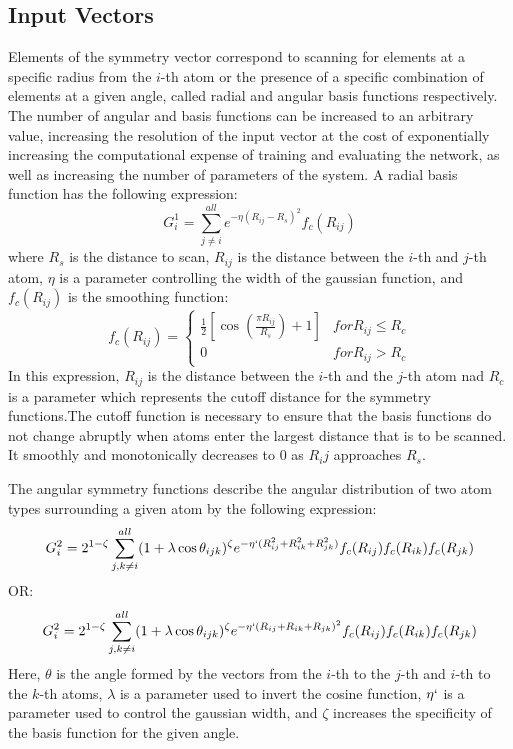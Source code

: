 \documentclass{article}
\begin{document}
\subsection{Input Vectors}
Elements of the symmetry vector correspond to scanning for elements at a specific radius from the $i$-th atom or the presence of a specific combination of elements at a given angle, called radial and angular basis functions respectively.
 The number of angular and basis functions can be increased to an arbitrary value, increasing the resolution of the input vector at the cost of exponentially increasing the computational expense of training and evaluating the network, as well as increasing the number of parameters of the system. 
 A radial basis function has the following expression:
\begin{equation}\label{eq:rad}
	G^{1}_{i} = \sum_{j \neq i}^{all} e^{-\eta ( R_{ij} - R_{s})^2} f_{c}(R_{ij})
\end{equation}
where $R_s$ is the distance to scan, $R_{ij}$ is the distance between the $i$-th and $j$-th atom, $\eta$ is a parameter controlling the width of the gaussian function, and $f_c(R_{ij})$ is the smoothing function:
\begin{equation}
 	f_c(R_{ij}) = 
	\begin{cases}
		\frac{1}{2}\left[\cos{(\frac{\pi R_{ij}} {R_s})} + 1 \right] & for R_{ij} \leq R_{c} \\
		0 & for R_{ij} > R_c

	\end{cases}
\end{equation}
In this expression, $R_{ij}$ is the distance between the $i$-th and the $j$-th atom nad $R_c$ is a parameter which represents the cutoff distance for the symmetry functions.The cutoff function is necessary to ensure that the basis functions do not change abruptly when atoms enter the largest distance that is to be scanned. It smoothly and monotonically decreases to 0 as $R_ij$ approaches $R_s$.

The angular symmetry functions describe the angular distribution of two atom types surrounding a given atom by the following expression:
\begin{equation}\label{eq:ang}
	G_i^2 = 2^{1 - \zeta} \sum_{j,k \neq i}^{all} ( 1 + \lambda \cos{\theta_{ijk}}) ^\zeta e^{-\eta` ( R_{ij}^2 + R_{ik}^2 + R_{jk}^2)} f_c (R_{ij}) f_c(R_{ik}) f_c(R_{jk})
\end{equation}
OR:
\begin{equation}\label{eq:ang}
	G_i^2 = 2^{1 - \zeta} \sum_{j,k \neq i}^{all} ( 1 + \lambda \cos{\theta_{ijk}}) ^\zeta e^{-\eta` ( R_{ij} + R_{ik} + R_{jk})^2} f_c (R_{ij}) f_c(R_{ik}) f_c(R_{jk})
\end{equation}
Here, $\theta$ is the angle formed by the vectors from the $i$-th to the $j$-th and $i$-th to the $k$-th atoms, $\lambda$ is a parameter used to invert the  cosine function, $\eta `$ is a parameter used to control the gaussian width, and $\zeta$ increases the specificity of the basis function for the given angle.
\end{document}
